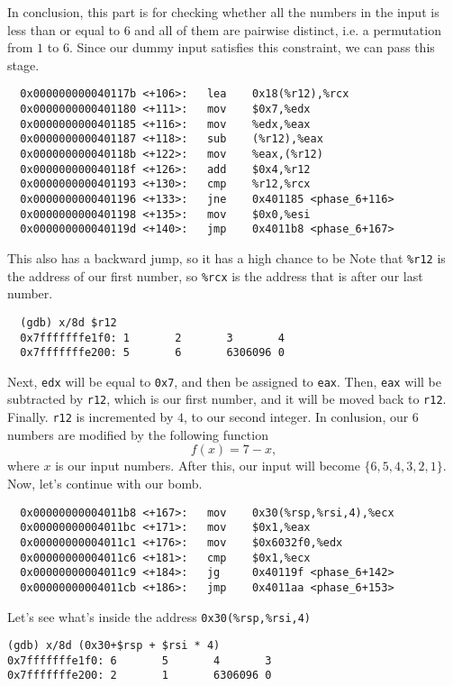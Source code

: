 In conclusion, this part is for checking whether all the numbers in the input is less than or equal to $6$ and all of them are pairwise distinct, i.e. a permutation from $1$ to $6$. Since our dummy input satisfies this constraint, we can pass this stage.
{\renewcommand\fcolorbox[4][]{\textcolor{cyan}{\strut#4}}
\begin{verbatim}
  0x000000000040117b <+106>:   lea    0x18(%r12),%rcx
  0x0000000000401180 <+111>:   mov    $0x7,%edx
  0x0000000000401185 <+116>:   mov    %edx,%eax
  0x0000000000401187 <+118>:   sub    (%r12),%eax
  0x000000000040118b <+122>:   mov    %eax,(%r12)
  0x000000000040118f <+126>:   add    $0x4,%r12
  0x0000000000401193 <+130>:   cmp    %r12,%rcx
  0x0000000000401196 <+133>:   jne    0x401185 <phase_6+116>
  0x0000000000401198 <+135>:   mov    $0x0,%esi
  0x000000000040119d <+140>:   jmp    0x4011b8 <phase_6+167>
\end{verbatim}
}\noindent
This also has a backward jump, so it has a high chance to be
Note that \verb|%r12| is the address of our first number, so \verb|%rcx| is the address that is after our last number.
{\renewcommand\fcolorbox[4][]{\textcolor{black}{\strut#4}}
\begin{verbatim}
  (gdb) x/8d $r12
  0x7fffffffe1f0: 1       2       3       4
  0x7fffffffe200: 5       6       6306096 0
\end{verbatim}
}\noindent
Next, \verb|edx| will be equal to \verb|0x7|, and then be assigned to \verb|eax|. Then, \verb|eax| will be subtracted by \verb|r12|, which is our first number, and it will be moved back to \verb|r12|. Finally. \verb|r12| is incremented by $4$, to our second integer. In conlusion, our 6 numbers are modified by the following function
$$ f(x) = 7 - x, $$
where $x$ is our input numbers. After this, our input will become $\{6, 5, 4, 3, 2, 1\}$. Now, let's continue with our bomb.
{\renewcommand\fcolorbox[4][]{\textcolor{cyan}{\strut#4}}
\begin{verbatim}
  0x00000000004011b8 <+167>:   mov    0x30(%rsp,%rsi,4),%ecx
  0x00000000004011bc <+171>:   mov    $0x1,%eax
  0x00000000004011c1 <+176>:   mov    $0x6032f0,%edx
  0x00000000004011c6 <+181>:   cmp    $0x1,%ecx
  0x00000000004011c9 <+184>:   jg     0x40119f <phase_6+142>
  0x00000000004011cb <+186>:   jmp    0x4011aa <phase_6+153>
\end{verbatim}
}\noindent
Let's see what's inside the address \verb|0x30(%rsp,%rsi,4)|
{\renewcommand\fcolorbox[4][]{\textcolor{black}{\strut#4}}
\begin{verbatim}
(gdb) x/8d (0x30+$rsp + $rsi * 4)
0x7fffffffe1f0: 6       5       4       3
0x7fffffffe200: 2       1       6306096 0
\end{verbatim}
}\noindent
